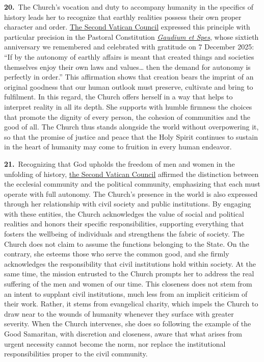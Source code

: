 \documentclass{article}
\begin{document}
\textbf{20.}\ The Church's vocation and duty to accompany humanity in the specifics of history leads her to recognize that earthly realities possess their own proper character and order. \href{https://www.vatican.va/archive/hist_councils/ii_vatican_council/index.htm}{The Second Vatican Council} expressed this principle with particular precision in the Pastoral Constitution \href{https://www.vatican.va/archive/hist_councils/ii_vatican_council/documents/vat-ii_const_19651207_gaudium-et-spes_en.html}{\emph{Gaudium et Spes}}, whose sixtieth anniversary we remembered and celebrated with gratitude on 7 December 2025: ``If by the autonomy of earthly affairs is meant that created things and societies themselves enjoy their own laws and values\dots{} then the demand for autonomy is perfectly in order.''\cite{n10} This affirmation shows that creation bears the imprint of an original goodness that our human outlook must preserve, cultivate and bring to fulfilment. In this regard, the Church offers herself in a way that helps to interpret reality in all its depth. She supports with humble firmness the choices that promote the dignity of every person, the cohesion of communities and the good of all. The Church thus stands alongside the world without overpowering it, so that the promise of justice and peace that the Holy Spirit continues to sustain in the heart of humanity may come to fruition in every human endeavor.

\textbf{21.}\ Recognizing that God upholds the freedom of men and women in the unfolding of history, \href{https://www.vatican.va/archive/hist_councils/ii_vatican_council/index.htm}{the Second Vatican Council} affirmed the distinction between the ecclesial community and the political community, emphasizing that each must operate with full autonomy. The Church's presence in the world is also expressed through her relationship with civil society and public institutions. By engaging with these entities, the Church acknowledges the value of social and political realities and honors their specific responsibilities, supporting everything that fosters the wellbeing of individuals and strengthens the fabric of society. The Church does not claim to assume the functions belonging to the State. On the contrary, she esteems those who serve the common good, and she firmly acknowledges the responsibility that civil institutions hold within society. At the same time, the mission entrusted to the Church prompts her to address the real suffering of the men and women of our time. This closeness does not stem from an intent to supplant civil institutions, much less from an implicit criticism of their work. Rather, it stems from evangelical charity, which impels the Church to draw near to the wounds of humanity whenever they surface with greater severity. When the Church intervenes, she does so following the example of the Good Samaritan, with discretion and closeness, aware that what arises from urgent necessity cannot become the norm, nor replace the institutional responsibilities proper to the civil community.
\end{document}
